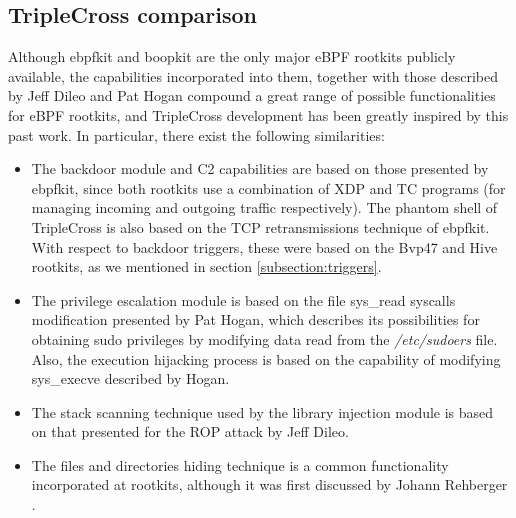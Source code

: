 \subsection{TripleCross comparison}
Although ebpfkit and boopkit are the only major eBPF rootkits publicly available, the capabilities incorporated into them, together with those described by Jeff Dileo and Pat Hogan compound a great range of possible functionalities for eBPF rootkits, and TripleCross development has been greatly inspired by this past work. In particular, there exist the following similarities:
\begin{itemize}
\item The backdoor module and C2 capabilities are based on those presented by ebpfkit, since both rootkits use a combination of XDP and TC programs (for managing incoming and outgoing traffic respectively). The phantom shell of TripleCross is also based on the TCP retransmissions technique of ebpfkit. With respect to backdoor triggers, these were based on the Bvp47 and Hive rootkits, as we mentioned in section \ref{subsection:triggers}.
\item The privilege escalation module is based on the file sys\_read syscalls modification presented by Pat Hogan, which describes its possibilities for obtaining sudo privileges by modifying data read from the \textit{/etc/sudoers} file. Also, the execution hijacking process is based on the capability of modifying sys\_execve described by Hogan.
\item The stack scanning technique used by the library injection module is based on that presented for the ROP attack by Jeff Dileo.
\item The files and directories hiding technique is a common functionality incorporated at rootkits, although it was first discussed by Johann Rehberger \cite{embracethered_getdents}.
\end{itemize}

